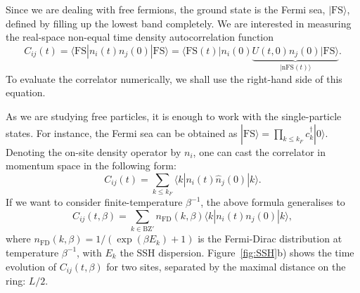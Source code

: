 \documentclass{SciPost}
\newcommand\0{\scalebox{-1}[1]{0}}
\begin{document}
Since we are dealing with free fermions, the ground state is the Fermi sea, $|\mathrm{FS}\rangle$, defined by filling up the lowest band completely. We are interested in measuring the real-space non-equal time density autocorrelation function
\begin{equation}
\label{eq:SSH_corr}
C_{ij}(t) = \langle \mathrm{FS}|n_i(t)n_j(0)|\mathrm{FS}\rangle = \langle \mathrm{FS}(t)|n_i(0)\underbrace{U(t,0)n_j(0)|\mathrm{FS}\rangle}_{|\mathrm{nFS}(t)\rangle}.
\end{equation}
To evaluate the correlator numerically, we shall use the right-hand side of this equation.

As we are studying free particles, it is enough to work with the single-particle states. For instance, the Fermi sea can be obtained as $|\mathrm{FS}\rangle = \prod_{k\leq k_F}c^\dagger_k|0\rangle$. Denoting the on-site density operator by $n_{i}$, one can cast the correlator in momentum space in the following form:
\begin{equation}
C_{ij}(t) = \sum_{k\leq k_F}\langle k|n_i(t)\hat n_j(0)|k\rangle.
\end{equation}
If we want to consider finite-temperature $\beta^{-1}$, the above formula generalises to
\begin{equation}
C_{ij}(t,\beta) = \sum_{k\in\mathrm{BZ'}}n_\mathrm{FD}(k,\beta)\langle k|n_i(t) n_j(0)|k\rangle,
\end{equation} 
where $n_\mathrm{FD}(k,\beta) = 1/(\exp(\beta E_k)+1)$ is the Fermi-Dirac distribution at temperature $\beta^{-1}$, with $E_k$ the SSH dispersion. Figure~\ref{fig:SSH}b) shows the time evolution of $C_{ij}(t,\beta)$ for two sites, separated by the maximal distance on the ring: $L/2$. 
\end{document}
